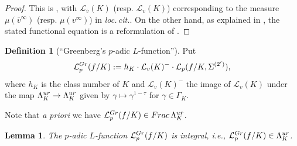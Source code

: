 \documentclass[a4paper,10pt]{amsart}
\numberwithin{equation}{section}
\numberwithin{equation}{section}
\theoremstyle{plain}
\theoremstyle{definition}
\newtheorem{defi}[thm]{Definition}
\theoremstyle{definition}
\theoremstyle{plain}
\theoremstyle{plain}
\newtheorem{lemma}[thm]{Lemma}
\theoremstyle{plain}
\theoremstyle{plain}
\newcommand{\Lcal}{\mathcal{L}}
\begin{document}
\begin{proof}
This is \cite[Thm.~II.4.14]{deshalit}, with $\Lcal_{\bar{v}}(K)$ (resp. $\Lcal_{{v}}(K)$) corresponding to the measure $\mu(\bar{v}^\infty)$ (resp. $\mu(v^\infty)$) in \emph{loc.\,cit.}. On the other hand, as explained in \cite[Lem.~3.3.2(b)]{7author}, the stated functional equation is a reformulation of \cite[Thm.~II.6.4]{deshalit}.
\end{proof}


\begin{defi}[``Greenberg's $p$-adic $L$-function'']\label{def:Gr}
Put
\[
\Lcal_p^{\rm Gr}(f/K):=h_K\cdot\Lcal_v(K)^-\cdot\Lcal_p(f/K,\Sigma^{(2')}),
\]
where $h_K$ is the class number of $K$ and $\Lcal_v(K)^-$ the image of $\Lcal_v(K)$ under the map $\Lambda_K^{\rm ur}\rightarrow\Lambda_K^{\rm ur}$ given by $\gamma\mapsto\gamma^{1-\tau}$ for $\gamma\in\Gamma_K$. 
\end{defi}

Note that \emph{a priori} we have $\Lcal_p^{\rm Gr}(f/K)\in{\rm Frac}\,\Lambda_K^{\rm ur}$. 

\begin{lemma}\label{lem:integral}
The $p$-adic $L$-function $\Lcal_p^{\rm Gr}(f/K)$ is integral, i.e., $\Lcal_p^{\rm Gr}(f/K)\in\Lambda_K^{\rm ur}$.
\end{lemma}
\end{document}
